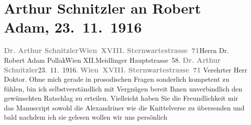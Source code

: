 

         
         \renewcommand{\erwaehntePersonen}{Personen: Robert Adam, Alexandre père Dumas}
         \renewcommand{\erwaehnteOrte}{Orte: Meidlinger Hauptstraße, Sternwartestraße 71, Wien, XII., Meidling}
         \renewcommand{\erwaehnteWerke}{Werke: Jean Christophe, Meine Memoiren, Wundervogel}
               \section[Arthur Schnitzler an Robert Adam, 23. 11. 1916]{ Arthur Schnitzler an Robert Adam, 23. 11. 1916}\nopagebreak{}\rehead{ }\begin{ledgroupsized}[t]{13cm}\normalsize\beginnumbering{} \toendnotes[C]{\smallbreak\pagebreak[2]} 
\toendnotes[C]{\smallbreak}\pstart{}{\pb}\textcolor{gray}{\textbf{Dr. Arthur Schnitzler}}\pend{}\pstart{}\textcolor{gray}{\textbf{Wien XVIII. Sternwartestrasse 71}}\pend{}{\bigskip}\pstart{}{\pb}Herrn Dr. Robert Adam Pollak\pend{}\pstart{}Wien XII.\pend{}\pstart{}Meidlinger Hauptstrasse 58.\pend{}{\bigskip}\pstart
           \noindent{}{\pb}\textcolor{gray}{\textbf{Dr. Arthur Schnitzler}}\hfill 23. 11. 1916.\pend
           \pstart
           \textcolor{gray}{\textbf{Wien XVIII. Sternwartestrasse 71}}\pend
           \pstart\center{}Verehrter Herr Doktor.\pend\pstart
           Ohne mich gerade in prosodischen Fragen sonderlich kompetent zu fühlen, bin ich
               selbstverständlich mit Vergnügen bereit Ihnen unverbindlich den gewünschten Ratschlag
               zu erteilen. Vielleicht haben Sie die Freundlichkeit mir das Manuscript sowohl die Alexandriner wie die
               Knittelverse zu übersenden und bald nachdem ich sie gelesen wollen wir uns persönlich

\end{ledgroupsized}
